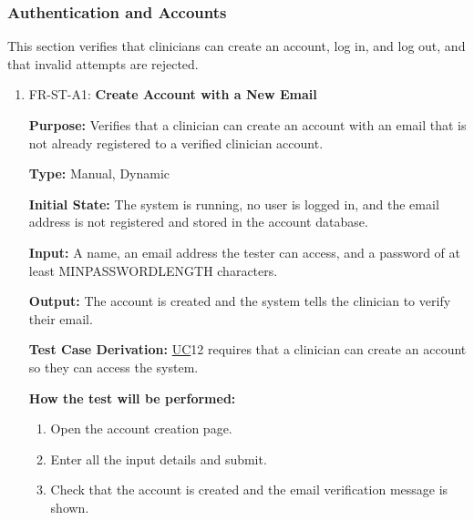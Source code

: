 \documentclass[12pt, titlepage]{article}
\newcommand{\srsuc}[1]{\href{https://github.com/Nour-Fawaz/MacaBoca/blob/main/pdfs/SRS/SRS.pdf}{UC}}
\renewcommand{\_}{\oldunderscore\allowbreak}
\begin{document}
\subsubsection{Authentication and Accounts}
This section verifies that clinicians can create an account, log in, and log out, and that invalid attempts are rejected.
\begin{enumerate}
  \item FR-ST-A1: \textbf{Create Account with a New Email\\}
  \begin{mdframed}[linewidth=0.5mm]
      \textbf{Purpose:} Verifies that a clinician can create an account with an email that is not already registered to a verified clinician account. \par
      \textbf{Type:} Manual, Dynamic \par
      \textbf{Initial State:} The system is running, no user is logged in, and the email address is not registered and stored in the account database. \par
      \textbf{Input:} A name, an email address the tester can access, and a password of at least MIN\_PASSWORD\_LENGTH characters. \par      \textbf{Output:} The account is created and the system tells the clinician to verify their email. \par
      \textbf{Test Case Derivation:} \srsuc*{12} requires that a clinician can create an account so they can access the system. \par
      \textbf{How the test will be performed:}
      \begin{enumerate}
          \item[1.] Open the account creation page.
          \item[2.] Enter all the input details and submit.
          \item[3.] Check that the account is created and the email verification message is shown.
      \end{enumerate}
  \end{mdframed}


\end{enumerate}
\end{document}
